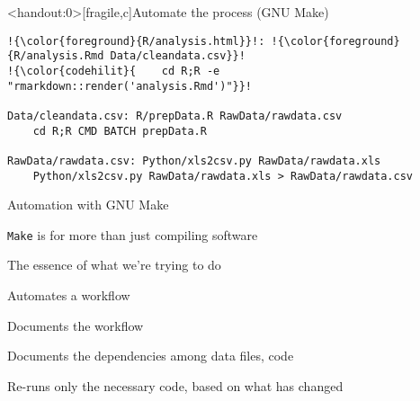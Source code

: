 \documentclass[12pt,t]{beamer}
\begin{document}
\begin{frame}<handout:0>[fragile,c]{Automate the process (GNU Make)}

\addtocounter{framenumber}{-1}

\begin{center}
\begin{minipage}[c]{10.8cm}
\begin{semiverbatim}
\begin{lstlisting}[escapechar=!,linewidth=10.8cm]
!{\color{foreground}{R/analysis.html}}!: !{\color{foreground}{R/analysis.Rmd Data/cleandata.csv}}!
!{\color{codehilit}{    cd R;R -e "rmarkdown::render('analysis.Rmd')"}}!

Data/cleandata.csv: R/prepData.R RawData/rawdata.csv
    cd R;R CMD BATCH prepData.R

RawData/rawdata.csv: Python/xls2csv.py RawData/rawdata.xls
    Python/xls2csv.py RawData/rawdata.xls > RawData/rawdata.csv
\end{lstlisting}
\end{semiverbatim}
\end{minipage}
\end{center}
\end{frame}



\begin{frame}{Automation with GNU Make}

\vspace{24pt}

\bi
\itemsep12pt
\item {\tt Make} is for more than just compiling software
\item The {\color{hilit} essence} of what we're trying to do
\item Automates a workflow
\item Documents the workflow
\item Documents the dependencies among data files, code
\item Re-runs only the necessary code, based on what has changed
\ei


\end{frame}
\end{document}
